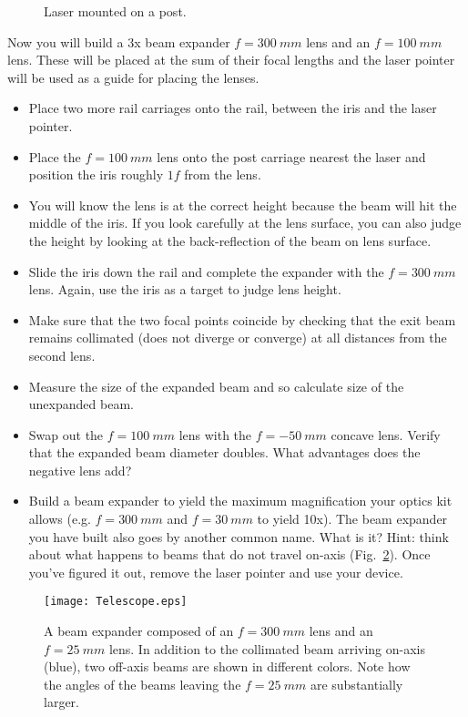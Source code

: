 \documentclass[a4paper]{report}
\begin{document}
	\begin{figure}[h]
		\center
		\caption{Laser mounted on a post.}
		\label{fig:mounted_laser}
	\end{figure}
	
	
	Now you will build a 3x beam expander $f=300~mm$ lens and an $f=100~mm$ lens. 
	These will be placed at the sum of their focal lengths and the laser pointer will be used as a guide for placing the lenses. 
	
	\begin{itemize}
		\item Place two more rail carriages onto the rail, between the iris and the laser pointer. 
		\item Place the $f=100~mm$ lens onto the post carriage nearest the laser and position the iris roughly $1f$ from the lens.
		\item You will know the lens is at the correct height because the beam will hit the middle of the iris. 
		If you look carefully at the lens surface, you can also judge the height by looking at the back-reflection of the beam on lens surface. 
		\item Slide the iris down the rail and complete the expander with the $f=300~mm$ lens. Again, use the iris as a target to judge lens height.
		\item Make sure that the two focal points coincide by checking that the exit beam remains collimated (does not diverge or converge)
		at all distances from the second lens. 
		\item Measure the size of the expanded beam and so calculate size of the unexpanded beam.
		\item Swap out the $f=100~mm$ lens with the $f=-50~mm$ concave lens. Verify that the expanded beam diameter doubles. 
		What advantages does the negative lens add?
		\item Build a beam expander to yield the maximum magnification your optics kit allows (e.g. $f=300~mm$ and $f=30~mm$ to yield 10x). 
		The beam expander you have built also goes by another common name.  What is it? 
		Hint: think about what happens to beams that do not travel on-axis (Fig.~\ref{fig:telescope}).
		Once you've figured it out, remove the laser pointer and use your device. 
	\end{itemize}
	
	
	\begin{figure}[h]
		\center
		\texttt{[image: Telescope.eps]}
		\caption{A beam expander composed of an $f=300~mm$ lens and an $f=25~mm$ lens. 
			In addition to the collimated beam arriving on-axis (blue), two off-axis beams are shown in different colors.
			Note how the angles of the beams leaving the $f=25~mm$ are substantially larger.}
		\label{fig:telescope}
	\end{figure}
	
\end{document}
